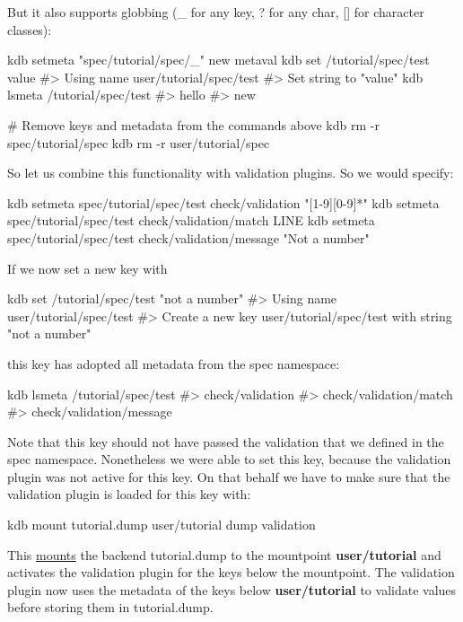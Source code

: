 But it also supports globbing ({\ttfamily \+\_\+} for any key, {\ttfamily ?} for any char, {\ttfamily \mbox{[}\mbox{]}} for character classes)\+:


\begin{DoxyCode}
kdb setmeta "spec/tutorial/spec/\_" new metaval
kdb set /tutorial/spec/test value
#> Using name user/tutorial/spec/test
#> Set string to "value"
kdb lsmeta /tutorial/spec/test
#> hello
#> new

# Remove keys and metadata from the commands above
kdb rm -r spec/tutorial/spec
kdb rm -r user/tutorial/spec
\end{DoxyCode}


So let us combine this functionality with validation plugins. So we would specify\+:


\begin{DoxyCode}
kdb setmeta spec/tutorial/spec/test check/validation "[1-9][0-9]*"
kdb setmeta spec/tutorial/spec/test check/validation/match LINE
kdb setmeta spec/tutorial/spec/test check/validation/message "Not a number"
\end{DoxyCode}


If we now set a new key with 
\begin{DoxyCode}
kdb set /tutorial/spec/test "not a number"
#> Using name user/tutorial/spec/test
#> Create a new key user/tutorial/spec/test with string "not a number"
\end{DoxyCode}
 this key has adopted all metadata from the spec namespace\+: 
\begin{DoxyCode}
kdb lsmeta /tutorial/spec/test
#> check/validation
#> check/validation/match
#> check/validation/message
\end{DoxyCode}
 Note that this key should not have passed the validation that we defined in the spec namespace. Nonetheless we were able to set this key, because the validation plugin was not active for this key. On that behalf we have to make sure that the validation plugin is loaded for this key with\+: 
\begin{DoxyCode}
kdb mount tutorial.dump user/tutorial dump validation
\end{DoxyCode}
 This \hyperlink{doc_tutorials_mount_md}{mounts} the backend {\ttfamily tutorial.\+dump} to the mountpoint {\bfseries user/tutorial} and activates the validation plugin for the keys below the mountpoint. The validation plugin now uses the metadata of the keys below {\bfseries user/tutorial} to validate values before storing them in {\ttfamily tutorial.\+dump}.

